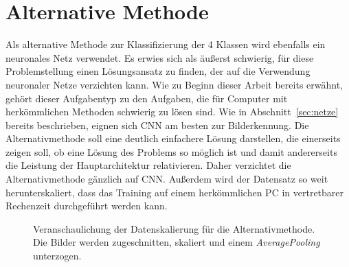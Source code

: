 \chapter{Alternative Methode}\label{sec:alter}
%
Als alternative Methode zur Klassifizierung der 4 Klassen wird ebenfalls ein
neuronales Netz verwendet. Es erwies sich als äußerst schwierig, für diese
Problemstellung einen Lösungsansatz zu finden, der auf die Verwendung
neuronaler Netze verzichten kann. Wie zu Beginn dieser Arbeit bereits erwähnt,
gehört dieser Aufgabentyp zu den Aufgaben, die für Computer mit herkömmlichen
Methoden schwierig zu lösen sind.
Wie in Abschnitt~\ref{sec:netze} bereits beschrieben, eignen sich CNN am besten
zur Bilderkennung. Die Alternativmethode soll eine deutlich einfachere Lösung
darstellen, die einerseits zeigen soll, ob eine Lösung des Problems so möglich
ist und damit andererseits die Leistung der Hauptarchitektur
relativieren. Daher verzichtet die Alternativmethode gänzlich auf CNN.
Außerdem wird der Datensatz so weit herunterskaliert, dass das Training auf
einem herkömmlichen PC in vertretbarer Rechenzeit durchgeführt werden kann.
%
\begin{figure}[h!]
  \hspace{5pt}
  \caption{Veranschaulichung der Datenskalierung für die Alternativmethode. Die Bilder werden zugeschnitten, skaliert und einem \textit{AveragePooling} unterzogen.}
  \label{fig:alter}
\end{figure}
